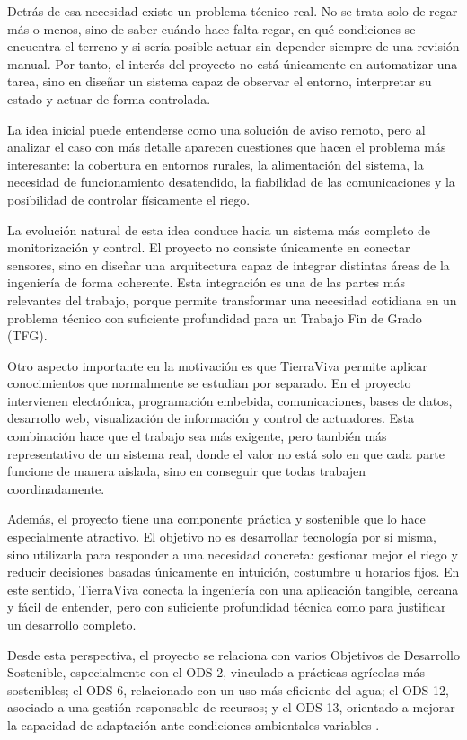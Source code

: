 Detrás de esa necesidad existe un problema técnico real. No se trata solo de regar más o menos, sino de saber cuándo hace falta regar, en qué condiciones se encuentra el terreno y si sería posible actuar sin depender siempre de una revisión manual. Por tanto, el interés del proyecto no está únicamente en automatizar una tarea, sino en diseñar un sistema capaz de observar el entorno, interpretar su estado y actuar de forma controlada.

La idea inicial puede entenderse como una solución de aviso remoto, pero al analizar el caso con más detalle aparecen cuestiones que hacen el problema más interesante: la cobertura en entornos rurales, la alimentación del sistema, la necesidad de funcionamiento desatendido, la fiabilidad de las comunicaciones y la posibilidad de controlar físicamente el riego.

La evolución natural de esta idea conduce hacia un sistema más completo de monitorización y control. El proyecto no consiste únicamente en conectar sensores, sino en diseñar una arquitectura capaz de integrar distintas áreas de la ingeniería de forma coherente. Esta integración es una de las partes más relevantes del trabajo, porque permite transformar una necesidad cotidiana en un problema técnico con suficiente profundidad para un Trabajo Fin de Grado (TFG).

Otro aspecto importante en la motivación es que TierraViva permite aplicar conocimientos que normalmente se estudian por separado. En el proyecto intervienen electrónica, programación embebida, comunicaciones, bases de datos, desarrollo web, visualización de información y control de actuadores. Esta combinación hace que el trabajo sea más exigente, pero también más representativo de un sistema real, donde el valor no está solo en que cada parte funcione de manera aislada, sino en conseguir que todas trabajen coordinadamente.

Además, el proyecto tiene una componente práctica y sostenible que lo hace especialmente atractivo. El objetivo no es desarrollar tecnología por sí misma, sino utilizarla para responder a una necesidad concreta: gestionar mejor el riego y reducir decisiones basadas únicamente en intuición, costumbre u horarios fijos. En este sentido, TierraViva conecta la ingeniería con una aplicación tangible, cercana y fácil de entender, pero con suficiente profundidad técnica como para justificar un desarrollo completo.

Desde esta perspectiva, el proyecto se relaciona con varios Objetivos de Desarrollo Sostenible, especialmente con el ODS 2, vinculado a prácticas agrícolas más sostenibles; el ODS 6, relacionado con un uso más eficiente del agua; el ODS 12, asociado a una gestión responsable de recursos; y el ODS 13, orientado a mejorar la capacidad de adaptación ante condiciones ambientales variables \cite{onu_ods2,onu_ods6,onu_ods12,onu_ods13}.

